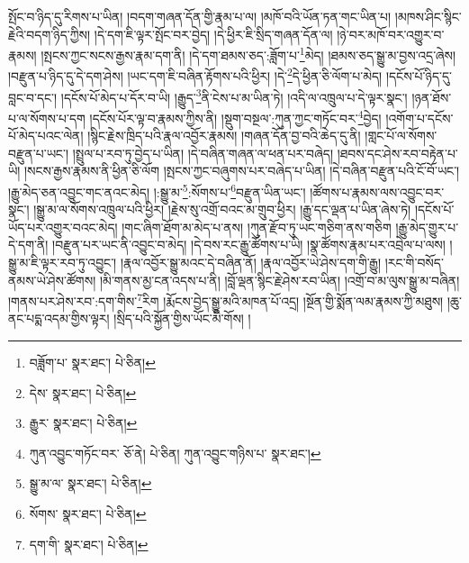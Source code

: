 སྤོང་བ་ཉིད་དུ་རིགས་པ་ཡིན། །བདག་གཞན་དོན་གྱི་རྣམ་པ་ལ། །མཁོ་བའི་ཡོན་ཏན་གང་ཡིན་པ། །མཁས་ཤིང་སྙིང་རྗེའི་བདག་ཉིད་ཀྱིས། །དེ་དག་ཇི་ལྟར་སྤོང་བར་བྱེད། །དེ་ཕྱིར་ཇི་སྲིད་གཞན་དོན་ལ། །ཉེ་བར་མཁོ་བར་འགྱུར་བ་རྣམས། །སྤངས་ཀྱང་སངས་རྒྱས་རྣམ་དག་ནི། །དེ་དག་ཐམས་ཅད་:ཟློག་པ་\footnote{བཟློག་པ་  སྣར་ཐང་།  པེ་ཅིན། }མེད། །ཐམས་ཅད་སྒྱུ་མ་བྱས་འདྲ་ཞེས། །བརྫུན་པ་ཉིད་དུ་དེ་དག་ཤེས། །ཡང་དག་ཇི་བཞིན་རྟོགས་པའི་ཕྱིར། །དེ་\footnote{དེས་  སྣར་ཐང་།  པེ་ཅིན། }དེ་ཕྱིན་ཅི་ལོག་པ་མེད། །དངོས་པོ་ཉིད་དུ་བླང་བ་དང་། །དངོས་པོ་མེད་པ་དོར་བ་ཡི། །རྒྱུད་\footnote{རྒྱུར་  སྣར་ཐང་།  པེ་ཅིན། }ནི་ངེས་པ་མ་ཡིན་ཏེ། །འདི་ལ་འཁྲུལ་པ་དེ་ལྟར་སྣང་། །ཉན་ཐོས་པ་ལ་སོགས་པ་དག །དངོས་པོར་ལྟ་བ་རྣམས་ཀྱིས་ནི། །སྡུག་བསྔལ་:ཀུན་ཀྱང་གཏོང་བར་\footnote{ཀུན་འབྱུང་གཏོང་བར་  ཅོ་ནེ།  པེ་ཅིན། ཀུན་འབྱུང་གཉིས་པ་  སྣར་ཐང་། }བྱེད། །འགོག་པ་དངོས་པོ་མེད་པའང་ལེན། །སྙིང་རྗེས་ཁྲིད་པའི་རྣལ་འབྱོར་རྣམས། །གཞན་དོན་བྱ་བའི་ཆེད་དུ་ནི། །གླང་པོ་ལ་སོགས་བརྫུན་པ་ཡང་། །སྤྲུལ་པ་རབ་ཏུ་བྱེད་པ་ཡིན། །དེ་བཞིན་གཞན་ལ་ཕན་པར་བཞེད། །ཐབས་དང་ཤེས་རབ་བརྟེན་པ་ཡི། །སངས་རྒྱས་རྣམས་ནི་ཕྱིན་ཅི་ལོག །སྤངས་ཀྱང་བཞུགས་པར་བཞེད་པ་ཡིན། །དེ་བཞིན་བརྫུན་པའི་ངོ་བོ་ཡང་། །རྒྱུ་མེད་ཅན་འབྱུང་གང་ནའང་མེད། །:སྒྱུ་མ་\footnote{སྒྱུ་མ་ལ་  སྣར་ཐང་།  པེ་ཅིན། }:སོགས་པ་\footnote{སོགས་  སྣར་ཐང་།  པེ་ཅིན། }བརྫུན་ཡིན་ཡང་། །ཚོགས་པ་རྣམས་ལས་འབྱུང་བར་སྣང་། །སྒྱུ་མ་ལ་སོགས་འཁྲུལ་པའི་ཕྱིར། །རྗེས་སུ་འགྲོ་བའང་མ་གྲུབ་ཕྱིར། །རྒྱུ་དང་ལྡན་པ་ཡིན་ཞེས་ཏེ། །དངོས་པོ་ཡོད་པར་འགྱུར་བའང་མེད། །གང་ཞིག་ཐོག་མ་མེད་པ་ནས། །ཀུན་རྫོབ་ཏུ་ཡང་གཅིག་ནས་གཅིག །རྒྱུ་མེད་གྱུར་པ་དེ་དག་ནི། །བརྫུན་པར་ཡང་ནི་འབྱུང་བ་མེད། །དེ་བས་རང་རྒྱུ་ཚོགས་པ་ཡི། །སྣ་ཚོགས་རྣམ་པར་འབྲེལ་པ་ལས། །སྒྱུ་མ་ཇི་ལྟར་རབ་ཏུ་འབྱུང་། །རྣལ་འབྱོར་སྒྱུ་མའང་དེ་བཞིན་ནོ། །རྣལ་འབྱོར་ཡེ་ཤེས་དག་གི་རྒྱུ། །རང་གི་བསོད་ནམས་ཡེ་ཤེས་ཚོགས། །མི་གནས་མྱ་ངན་འདས་པ་ནི། །བློ་ལྡན་སྙིང་རྗེ་ཤེས་རབ་ཡིན། །འགྲོ་བ་མ་ལུས་སྒྱུ་མ་བཞིན། །གནས་པར་ཤེས་རབ་:དག་གིས་\footnote{དག་གི་  སྣར་ཐང་།  པེ་ཅིན། }རིག །རྨོངས་བྱེད་སྒྱུ་མའི་མཁན་པོ་འདྲ། །སྔོན་གྱི་སྨོན་ལམ་རྣམས་ཀྱི་མཐུས། །ཆུ་ནང་པདྨ་འདམ་གྱིས་ལྟར། །སྲིད་པའི་སྐྱོན་གྱིས་ཡོང་མི་གོས། །
